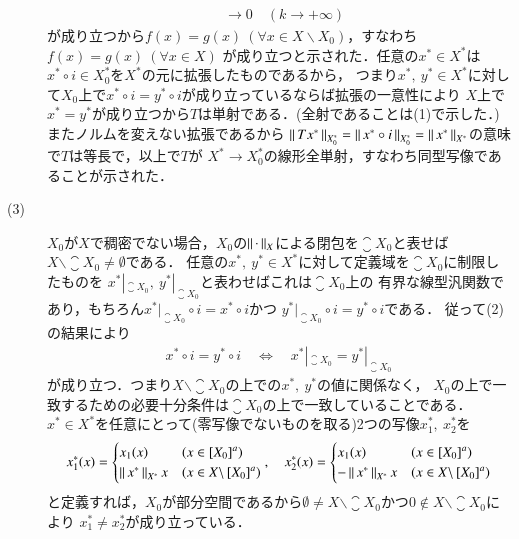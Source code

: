 \begin{prf}
\begin{description}
\begin{align}
			&\longrightarrow 0 \quad (k \longrightarrow +\infty)
		\end{align}
		が成り立つから$f(x) = g(x)\ (\forall x \in X \backslash X_0)$，すなわち$f(x) = g(x)\ (\forall x \in X)$
		が成り立つと示された．任意の$x^* \in X^*$は$x^* \circ i \in X_0^*$を$X^*$の元に拡張したものであるから，
		つまり$x^*,\ y^* \in X^*$に対して$X_0$上で$x^* \circ i = y^* \circ i$が成り立っているならば拡張の一意性により
		$X$上で$x^* = y^*$が成り立つから$T$は単射である．(全射であることは(1)で示した．)またノルムを変えない拡張であるから
		$\left\|\, T x^*\, \right\|_{X_0^*} = \left\|\, x^* \circ i\, \right\|_{X_0^*} = \left\|\, x^*\, \right\|_{X^*}$の意味で$T$は等長で，以上で$T$が
		$X^* \longrightarrow X_0^*$の線形全単射，すなわち同型写像であることが示された．
	\item[(3)] $X_0$が$X$で稠密でない場合，$X_0$の$\left\|\, \cdot\, \right\|_{X}$による閉包を$\closure{X_0}$と表せば
		$X \backslash \closure{X_0} \neq \emptyset$である．
		任意の$x^*,\ y^* \in X^*$に対して定義域を$\closure{X_0}$に制限したものを
		$x^*|_{\closure{X_0}},\ y^*|_{\closure{X_0}}$と表わせばこれは$\closure{X_0}$上の
		有界な線型汎関数であり，もちろん$x^*|_{\closure{X_0}} \circ i = x^* \circ i$かつ
		$y^*|_{\closure{X_0}} \circ i = y^* \circ i$である．
		従って(2)の結果により
		\begin{align}
			x^* \circ i = y^* \circ i
			\quad \Leftrightarrow \quad x^*|_{\closure{X_0}} = y^*|_{\closure{X_0}}
		\end{align}
		が成り立つ．つまり$X \backslash \closure{X_0}$の上での$x^*,\ y^*$の値に関係なく，
		$X_0$の上で一致するための必要十分条件は$\closure{X_0}$の上で一致していることである．
		$x^* \in X^*$を任意にとって(零写像でないものを取る)2つの写像$x_1^*,\ x_2^*$を
		\begin{align}
			x_1^*(x) = \begin{cases}
				x_1(x) & (x \in \left[X_0\right]^a) \\
				\left\|\, x^*\, \right\|_{X^*} x & (x \in X \backslash \left[X_0\right]^a)
			\end{cases}, \quad
			x_2^*(x) = \begin{cases}
				x_1(x) & (x \in \left[X_0\right]^a) \\
				- \left\|\, x^*\, \right\|_{X^*} x & (x \in X \backslash \left[X_0\right]^a)
			\end{cases}
		\end{align}
		と定義すれば，$X_0$が部分空間であるから$\emptyset \neq X \backslash \closure{X_0}$かつ$0 \notin X \backslash \closure{X_0}$により
		$x_1^* \neq x_2^*$が成り立っている．
\end{description}
\end{prf}

